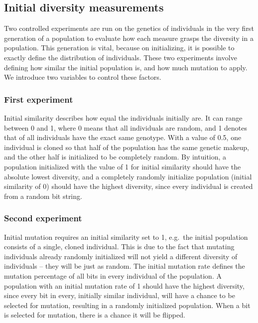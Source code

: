 \subsection{Initial diversity measurements}
Two controlled experiments are run on the genetics of individuals in the very first generation of a population to evaluate how each measure grasps the diversity in a population. This generation is vital, because on initializing, it is possible to exactly define the distribution of individuals. These two experiments involve defining how similar the initial population is, and how much mutation to apply. We introduce two variables to control these factors.

\subsubsection{First experiment}
Initial similarity describes how equal the individuals initially are. It can range between \num{0} and \num{1}, where \num{0} means that all individuals are random, and \num{1} denotes that  of all individuals have the exact same genotype. With a value of \num{0.5}, one individual is cloned so that half of the population has the same genetic makeup, and the other half is initialized to be completely random. By intuition, a population initialized with the value of \num{1} for initial similarity should have the absolute lowest diversity, and a completely randomly initialize population (initial similarity of \num{0}) should have the highest diversity, since every individual is created from a random bit string.

\subsubsection{Second experiment}
Initial mutation requires an initial similarity set to \num{1}, e.g.\ the initial population consists of a single, cloned individual. This is due to the fact that mutating individuals already randomly initialized will not yield a different diversity of individuals -- they will be just as random. The initial mutation rate defines the mutation percentage of all bits in every individual of the population. A population with an initial mutation rate of \num{1} should have the highest diversity, since every bit in every, initially similar individual, will have a  chance to be selected for mutation, resulting in a randomly initialized population. When a bit is selected for mutation, there is a  chance it will be flipped.

